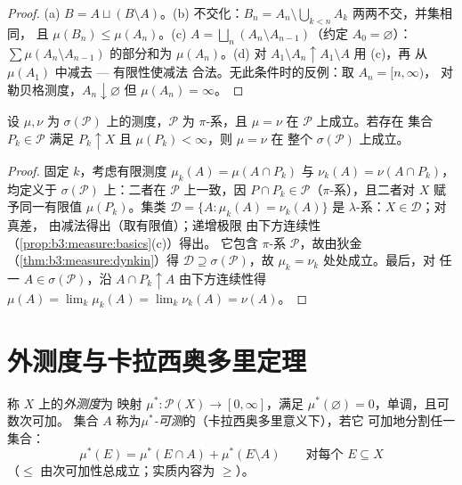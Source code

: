 \begin{proof}
(a) $B = A \sqcup (B\setminus A)$。(b) 不交化：$B_n = A_n
\setminus \bigcup_{k<n}A_k$ 两两不交，并集相同，
且 $\mu(B_n) \leq \mu(A_n)$。(c) $A = \bigsqcup_n (A_n
\setminus A_{n-1})$（约定 $A_0 = \varnothing$）：
$\sum\mu(A_n\setminus A_{n-1})$ 的部分和为 $\mu(A_n)$。(d) 对
$A_1 \setminus A_n \uparrow A_1 \setminus A$ 用 (c)，再
从 $\mu(A_1)$ 中减去 --- 有限性使减法
合法。无此条件时的反例：取 $A_n = [n, \infty)$，
对勒贝格测度，$A_n \downarrow \varnothing$ 但 $\mu(A_n) =
\infty$。
\end{proof}

\begin{theorem}[唯一性]\label{thm:b3:measure:uniqueness}
设 $\mu, \nu$ 为 $\sigma(\mathcal P)$ 上的测度，$\mathcal
P$ 为 $\pi$-系，且 $\mu = \nu$ 在 $\mathcal P$ 上成立。若存在
集合 $P_k \in \mathcal P$ 满足 $P_k \uparrow X$ 且
$\mu(P_k) < \infty$，则 $\mu = \nu$ 在
整个 $\sigma(\mathcal P)$ 上成立。
\end{theorem}

\begin{proof}
固定 $k$，考虑有限测度 $\mu_k(A) = \mu(A \cap
P_k)$ 与 $\nu_k(A) = \nu(A \cap P_k)$，均定义于 $\sigma(\mathcal
P)$ 上：二者在 $\mathcal P$ 上一致，因 $P \cap P_k \in \mathcal
P$（$\pi$-系），且二者对 $X$ 赋予同一有限值
$\mu(P_k)$。集类 $\mathcal D = \{A : \mu_k(A) =
\nu_k(A)\}$ 是 $\lambda$-系：$X \in \mathcal D$；对真差，
由减法得出（取有限值）；递增极限
由下方连续性（\cref{prop:b3:measure:basics}(c)）得出。
它包含 $\pi$-系 $\mathcal P$，故由狄金
（\cref{thm:b3:measure:dynkin}）得 $\mathcal D \supseteq
\sigma(\mathcal P)$，故 $\mu_k = \nu_k$ 处处成立。最后，对
任一 $A \in \sigma(\mathcal P)$，沿 $A
\cap P_k \uparrow A$ 由下方连续性得 $\mu(A) = \lim_k\mu_k(A) =
\lim_k\nu_k(A) = \nu(A)$。
\end{proof}

\section{外测度与卡拉西奥多里定理}

\begin{definition}\label{def:b3:measure:outer}
称 $X$ 上的\emph{外测度}为
映射 $\mu^* \colon \mathcal P(X) \to [0, \infty]$，满足
$\mu^*(\varnothing) = 0$，单调，且可数次可加。
集合 $A$ 称为\emph{$\mu^*$-可测}的（卡拉西奥多里意义下），若它
可加地分割任一集合：
\[
\mu^*(E) = \mu^*(E \cap A) + \mu^*(E \setminus A)
\qquad \text{对每个 } E \subseteq X
\]
（$\leq$ 由次可加性总成立；实质内容为 $\geq$）。
\end{definition}

